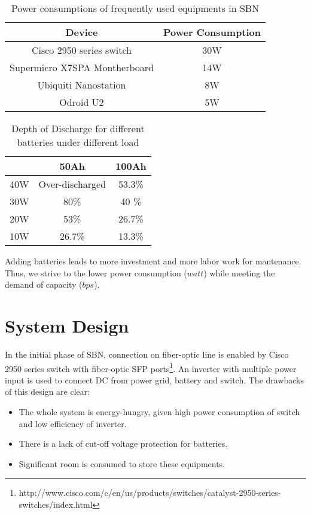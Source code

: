 \begin{table}\label{power_consumptions}
\centering
\begin{tabular}{cc}
\hline
Device & Power Consumption \\
\hline
Cisco 2950 series switch & 30W \\
Supermicro X7SPA Montherboard & 14W \\
Ubiquiti Nanostation & 8W \\
Odroid U2 & 5W \\
\hline
\end{tabular}
\caption{Power consumptions of frequently used equipments in SBN}
\end{table}

\begin{table}\label{dod}
\centering
\begin{tabular}{c|cc}
\hline
 & 50Ah & 100Ah \\
\hline
40W & Over-discharged & 53.3\% \\
30W & 80\% & 40 \% \\
20W & 53\% & 26.7\% \\
10W & 26.7\% & 13.3\% \\
\hline
\end{tabular}
\caption{Depth of Discharge for different batteries under different load}
\end{table}

Adding batteries leads to more investment and more labor work for mantenance. Thus, we strive to the lower power consumption ($watt$) while meeting the demand of capacity ($bps$).  

\section{System Design}\label{sysdesign}
In the initial phase of SBN, connection on fiber-optic line is enabled by Cisco 2950 series switch with fiber-optic SFP ports\footnote{http://www.cisco.com/c/en/us/products/switches/catalyst-2950-series-switches/index.html}. An inverter with multiple power input is used to connect DC from power grid, battery and switch. The drawbacks of this design are clear:
\begin{itemize}
\item The whole system is energy-hungry, given high power consumption of switch and low efficiency of inverter.
\item There is a lack of cut-off voltage protection for batteries.
\item Significant room is consumed to store these equipments.
\end{itemize}


